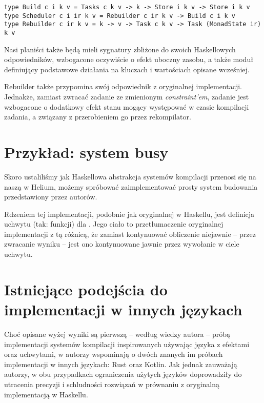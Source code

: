 \begin{lstlisting}
type Build c i k v = Tasks c k v -> k -> Store i k v -> Store i k v
type Scheduler c i ir k v = Rebuilder c ir k v -> Build c i k v
type Rebuilder c ir k v = k -> v -> Task c k v -> Task (MonadState ir) k v
\end{lstlisting}

Nasi planiści także będą mieli sygnatury zbliżone do swoich Haskellowych odpowiedników, wzbogacone oczywiście o efekt uboczny zasobu, a także moduł definiujący podstawowe działania na kluczach i wartościach opisane wcześniej.



Rebuilder także przypomina swój odpowiednik z oryginalnej implementacji. Jednakże, zamiast zwracać zadanie ze zmienionym \textit{constraint'em}, zadanie jest wzbogacone o dodatkowy efekt stanu mogący występować w czasie kompilacji zadania, a związany z przerobieniem go przez rekompilator.

\section{Przykład: system busy}

Skoro ustaliliśmy jak Haskellowa abstrakcja systemów kompilacji przenosi się na naszą w Helium, możemy spróbować zaimplementować prosty system budowania  przedstawiony przez autorów.



Rdzeniem tej implementacji, podobnie jak oryginalnej w Haskellu, jest definicja uchwytu (tak: funkcji) dla . Jego ciało to przetłumaczenie oryginalnej implementacji z tą różnicą, że zamiast kontynuować obliczenie niejawnie -- przez zwracanie wyniku -- jest ono kontynuowane jawnie przez wywołanie  w ciele uchwytu.

\section{Istniejące podejścia do implementacji w innych językach}

Choć opisane wyżej wyniki są pierwszą -- według wiedzy autora -- próbą implementacji systemów kompilacji inspirowanych \BSaLC\cite{mokhov2018build} używając języka z efektami oraz uchwytami, w \BSaLCTP\cite{mokhov2020build} autorzy wspominają o dwóch znanych im próbach implementacji w innych językach: Rust\cite{translation_rust} oraz Kotlin\cite{translation_kotlin}. Jak jednak zauważają autorzy, w obu przypadkach ograniczenia użytych języków doprowadziły do utracenia precyzji i schludności rozwiązań w prównaniu z oryginalną implementacją w Haskellu.
